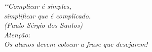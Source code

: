 \begin{epigrafe}
\vspace*{\fill}
\begin{flushright}
\textit{‘‘Complicar é simples, \\
simplificar que é complicado.\\
(Paulo Sérgio dos Santos)\\
Atenção: \\%
Os alunos devem colocar a frase que desejarem!}
\end{flushright}
\end{epigrafe}
